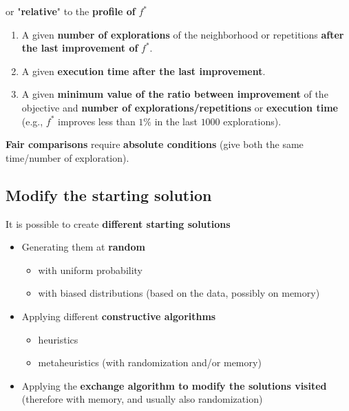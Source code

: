 or "\textbf{relative}" to the \textbf{profile of} $f^\ast$
\begin{enumerate}
	\item A given \textbf{number of explorations} of the neighborhood or repetitions \textbf{after the last improvement of} $f^\ast$.\\
	
	\item A given \textbf{execution time after the last improvement}.\\
	
	\item A given \textbf{minimum value of the ratio between improvement} of the objective and \textbf{number of explorations/repetitions} or \textbf{execution time} (e.g., $f^\ast$ improves less than $1\%$ in the last $1000$ explorations).\\
\end{enumerate}

\textbf{Fair comparisons} require \textbf{absolute conditions} (give both the same time/number of exploration).\\

\newpage

\subsection{Modify the starting solution}

It is possible to create \textbf{different starting solutions}
\begin{itemize}
	\item Generating them at \textbf{random}
	\begin{itemize}
		\item with uniform probability
		\item with biased distributions (based on the data, possibly on memory)
	\end{itemize}
	\nn
	
	\item Applying different \textbf{constructive algorithms}
	\begin{itemize}
		\item heuristics
		\item metaheuristics (with randomization and/or memory)
	\end{itemize}
	\nn
	
	\item Applying the \textbf{exchange algorithm to modify the solutions visited} (therefore with memory, and usually also randomization)
\end{itemize}

